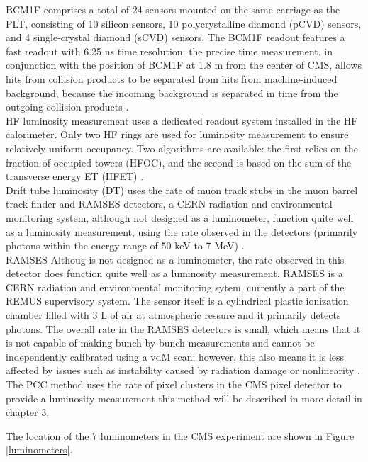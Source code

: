 BCM1F comprises a total of 24 sensors mounted on the same carriage as the PLT, consisting of 10 silicon sensors, 10 polycrystalline diamond (pCVD) sensors, and 4 single-crystal diamond (sCVD) sensors. The BCM1F readout features a fast readout with 6.25 ns time resolution; the precise time measurement, in conjunction with the position of BCM1F at 1.8 m from the center of CMS, allows hits from collision products to be separated from hits from machine-induced background, because the incoming background is separated in time from the outgoing collision products  \cite{pas_18}.\\ 

HF luminosity measurement uses a dedicated readout system installed in the HF calorimeter. Only two HF rings are used for luminosity measurement to ensure relatively uniform occupancy. Two algorithms are available: the first relies on the fraction of occupied towers (HFOC), and the second is based on the sum of the transverse energy ET (HFET)  \cite{pas_18}.\\

Drift tube luminosity (DT) uses the rate of muon track stubs in the muon barrel track finder and  RAMSES detectors, a CERN radiation and environmental monitoring system, although not designed as a luminometer, function quite well as a luminosity measurement, using the rate observed in the detectors (primarily photons within the energy range of 50 keV to 7 MeV) \cite{pas_18}.\\

RAMSES  Althoug is not designed as a luminometer, the rate observed in this detector does function quite well as a luminosity measurement. RAMSES is a CERN radiation and environmental monitoring sytem, currently a part of the REMUS supervisory system. The sensor itself is a cylindrical plastic ionization chamber filled with 3 L of air at atmospheric ressure and it primarily detects photons.  The overall rate in the RAMSES detectors is small, which means that it is not capable of making bunch-by-bunch measurements and cannot be independently calibrated using a vdM scan; however, this also means it is less affected by issues such as instability caused by radiation damage or nonlinearity \cite{pas_18}.\\

The PCC method uses the rate of pixel clusters in the CMS pixel detector to provide a luminosity measurement this method will be described in more detail in chapter 3.  


The location of the 7 luminometers in the CMS experiment are shown in Figure \ref{luminometers}.

